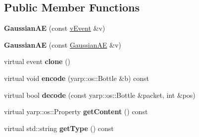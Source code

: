 \subsection*{Public Member Functions}
\begin{DoxyCompactItemize}
\item 
{\bfseries Gaussian\+AE} (const \hyperlink{classev_1_1vEvent}{v\+Event} \&v)\hypertarget{classev_1_1GaussianAE_abc9c34d68ad44ea743b565a6206e591f}{}\label{classev_1_1GaussianAE_abc9c34d68ad44ea743b565a6206e591f}

\item 
{\bfseries Gaussian\+AE} (const \hyperlink{classev_1_1GaussianAE}{Gaussian\+AE} \&v)\hypertarget{classev_1_1GaussianAE_ac5934905f00cc08eb9c444f67e0ec6a2}{}\label{classev_1_1GaussianAE_ac5934905f00cc08eb9c444f67e0ec6a2}

\item 
virtual event {\bfseries clone} ()\hypertarget{classev_1_1GaussianAE_aa9e649d9039d3e9348cea99352df77c5}{}\label{classev_1_1GaussianAE_aa9e649d9039d3e9348cea99352df77c5}

\item 
virtual void {\bfseries encode} (yarp\+::os\+::\+Bottle \&b) const \hypertarget{classev_1_1GaussianAE_a305a85a18095be68f6ccef59bc1ee9a7}{}\label{classev_1_1GaussianAE_a305a85a18095be68f6ccef59bc1ee9a7}

\item 
virtual bool {\bfseries decode} (const yarp\+::os\+::\+Bottle \&packet, int \&pos)\hypertarget{classev_1_1GaussianAE_a7d673491b6b6e243d44131527c0ded39}{}\label{classev_1_1GaussianAE_a7d673491b6b6e243d44131527c0ded39}

\item 
virtual yarp\+::os\+::\+Property {\bfseries get\+Content} () const \hypertarget{classev_1_1GaussianAE_a986a28cb312c870c8e7fc1bc178a8a5a}{}\label{classev_1_1GaussianAE_a986a28cb312c870c8e7fc1bc178a8a5a}

\item 
virtual std\+::string {\bfseries get\+Type} () const \hypertarget{classev_1_1GaussianAE_a902ce886c1c5a2af42e073c3c7992bd5}{}\label{classev_1_1GaussianAE_a902ce886c1c5a2af42e073c3c7992bd5}

\end{DoxyCompactItemize}
